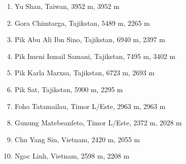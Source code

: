 \documentclass[10pt,twocolumn,letterpaper]{article}
\begin{document}
\begin{flushleft}
\begin{enumerate}
    \item Yu Shan, Taiwan, 3952 m, 3952 m
    \item Gora Chimtarga, Tajikstan, 5489 m, 2265 m
    \item Pik Abu Ali Ibn Sino, Tajikstan, 6940 m, 2397 m
    \item Pik Imeni Ismail Samani, Tajikstan, 7495 m, 3402 m
    \item Pik Karla Marxsa, Tajikstan, 6723 m, 2693 m
    \item Pik Sat, Tajikstan, 5900 m, 2295 m
    \item Foho Tatamailau, Timor L/Este, 2963 m, 2963 m
    \item Gunung Matebeanfeto, Timor L/Este, 2372 m, 2028 m
    \item Chu Yang Sin, Vietnam, 2420 m, 2055 m
    \item Ngoc Linh, Vietnam, 2598 m, 2208 m
\end{enumerate}
\end{flushleft}
\end{document}
